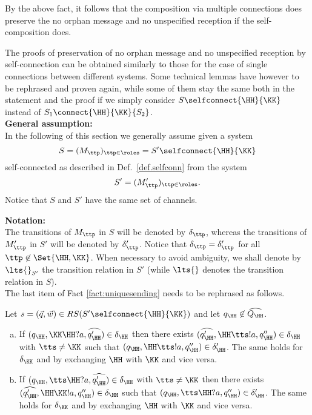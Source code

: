  By the above fact, it follows that the composition via multiple connections does preserve the no orphan message and no unspecified reception if the self-composition does.
 

The proofs of preservation of no orphan message and no unspecified reception by self-connection
can be obtained similarly to those for the case of single connections between different systems.
Some technical lemmas have however to be rephrased and proven again, while some of them 
stay the same both in the statement and the proof if we simply consider $S\selfconnect{\HH}{\KK}$
instead of ${S_1}\connect{{\HH}}{{\KK}} {S_2}$.\\

\noindent\textbf{General assumption:}\\ 
In the following of this section we generally assume given a
system  
$$S= (M_\ttp)_{\ttp\in\roles} ={S'\selfconnect{\HH}{\KK}}$$  
self-connected
as described in Def.~\ref{def.selfconn}
from the system
$$S'= (M'_\ttp)_{\ttp\in\roles}.$$
Notice that $S$ and $S'$ have the same set of channels.

\vspace{2mm}
\noindent\textbf{Notation:} \\
The transitions of $M_\ttp$ in $S$ will be denoted by $\delta_\ttp$, whereas the 
transitions of $M'_\ttp$ in $S'$ will be denoted by $\delta'_\ttp$.
Notice that $\delta_\ttp = \delta'_\ttp$ for all  $\ttp\not\in\Set{\HH,\KK}$.
When necessary to avoid ambiguity, we shall denote by $\lts{}_{S'}$ the transition relation in $S'$
(while $\lts{}$ denotes the transition relation in $S$).\\
 
The last  item of Fact \ref{fact:uniquesending} needs to be rephrased as follows.

\begin{fact}
\label{fact:uniquesendingself}
Let $s= (\vec{q},\vec{w}) \in RS(S'\selfconnect{\HH}{\KK})$ and let ${q_\HH}\not\in\widehat{Q_\HH}$.
\begin{enumerate}[a)]
\item
If $(q_\HH,\KK\HH?a,\widehat{q'_\HH})\in\delta_\HH$  then there exists $(\widehat{q'_\HH},\HH\tts!a,q''_\HH)\in\delta_\HH$ with $\tts \neq \KK$
such that $(q_\HH,\HH\tts!a,q''_\HH)\in\delta'_\HH$.
The same holds for $\delta_\KK$ and by exchanging $\HH$ with $\KK$ and vice versa.
\item
If $(q_\HH,\tts\HH?a,\widehat{q'_\HH})\in\delta_\HH$ with $\tts \neq \KK$  then there exists   $(\widehat{q'_\HH},\HH\KK!a,q''_\HH)\in\delta_\HH$  
such that $(q_\HH,\tts\HH?a,q''_\HH)\in\delta'_\HH$.
The same holds for $\delta_\KK$ and by exchanging $\HH$ with $\KK$ and vice versa.
\end{enumerate}
\end{fact}
 
